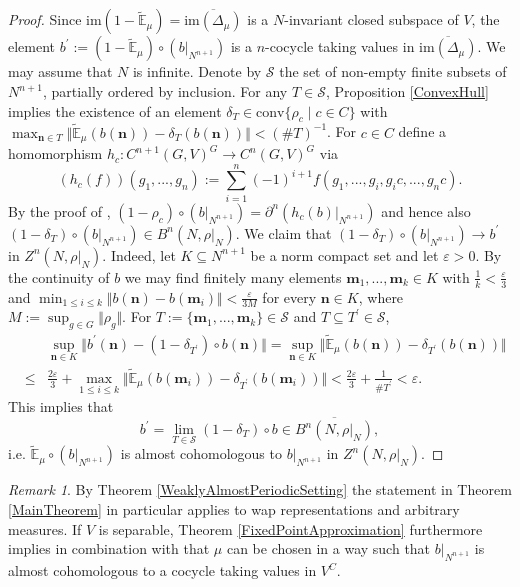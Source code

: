 \documentclass[a4paper,11pt,reqno]{amsart}
\numberwithin{equation}{section}
\theoremstyle{definition}
\theoremstyle{remark}
\theoremstyle{remark}
\newtheorem{remark}[theorem]{Remark}
\begin{document}
\begin{proof}
Since $\text{im}(1-\widetilde{\mathbb{E}}_{\mu})=\overline{\text{im}(\Delta_{\mu})}$ is a $N$-invariant closed subspace of $V$, the element $b^{\prime}:=(1-\widetilde{\mathbb{E}}_{\mu})\circ(b|_{N^{n+1}})$ is a $n$-cocycle taking values in $\overline{\text{im}(\Delta_{\mu})}$. We may assume that $N$ is infinite. Denote by $\mathcal{S}$ the set of non-empty finite subsets of $N^{n+1}$, partially ordered by inclusion. For any $T\in\mathcal{S}$, Proposition \ref{ConvexHull} implies the existence of an element $\delta_{T}\in\text{conv}\{\rho_{c}\mid c\in C\}$ with $\max_{\mathbf{n}\in T}\Vert\widetilde{\mathbb{E}}_{\mu}(b(\mathbf{n}))-\delta_{T}(b(\mathbf{n}))\Vert<(\#T)^{-1}$. For $c\in C$ define a homomorphism $h_{c}:C^{n+1}(G,V)^{G}\rightarrow C^{n}(G,V)^{G}$ via 
\[
\left(h_{c}(f)\right)(g_{1},...,g_{n}):=\sum_{i=1}^{n}(-1)^{i+1}f(g_{1},...,g_{i},g_{i}c,...,g_{n}c).
\]
By the proof of \cite[Lemma 18]{BaderRosendalSauer}, $(1-\rho_{c})\circ(b|_{N^{n+1}})=\partial^{n}\left(h_{c}(b)|_{N^{n+1}}\right)$ and hence also $(1-\delta_{T})\circ(b|_{N^{n+1}})\in B^{n}(N,\rho|_{N})$. We claim that $(1-\delta_{T})\circ(b|_{N^{n+1}})\rightarrow b^{\prime}$ in $Z^{n}(N,\rho|_{N})$. Indeed, let $K\subseteq N^{n+1}$ be a norm compact set and let $\varepsilon>0$. By the continuity of $b$ we may find finitely many elements $\mathbf{m}_{1},...,\mathbf{m}_{k}\in K$ with $\frac{1}{k}<\frac{\varepsilon}{3}$ and $\min_{1\leq i\leq k}\Vert b(\mathbf{n})-b(\mathbf{m}_{i})\Vert<\frac{\varepsilon}{3M}$ for every $\mathbf{n}\in K$, where $M:=\sup_{g\in G}\Vert\rho_{g}\Vert$. For $T:=\{\mathbf{m}_{1},...,\mathbf{m}_{k}\}\in\mathcal{S}$ and $T\subseteq T^{\prime}\in\mathcal{S}$, 
\begin{eqnarray*}
 &  & \sup_{\mathbf{n}\in K}\Vert b^{\prime}(\mathbf{n})-(1-\delta_{T^{\prime}})\circ b(\mathbf{n})\Vert=\sup_{\mathbf{n}\in K}\Vert\widetilde{\mathbb{E}}_{\mu}(b(\mathbf{n}))-\delta_{T^{\prime}}(b(\mathbf{n}))\Vert\\
 & \leq & \frac{2\varepsilon}{3}+\max_{1\leq i\leq k}\Vert\widetilde{\mathbb{E}}_{\mu}(b(\mathbf{m}_{i}))-\delta_{T^{\prime}}(b(\mathbf{m}_{i}))\Vert<\frac{2\varepsilon}{3}+\frac{1}{\#T^{\prime}}<\varepsilon.
\end{eqnarray*}
This implies that 
\[
b^{\prime}=\lim_{T\in\mathcal{S}}(1-\delta_{T})\circ b\in\overline{B^{n}(N,\rho|_{N})},
\]
i.e. $\widetilde{\mathbb{E}}_{\mu}\circ(b|_{N^{n+1}})$ is almost cohomologous to $b|_{N^{n+1}}$ in $Z^{n}(N,\rho|_{N})$. \end{proof}

\begin{remark} By Theorem \ref{WeaklyAlmostPeriodicSetting} the statement in Theorem \ref{MainTheorem} in particular applies to wap representations and arbitrary measures. If $V$ is separable, Theorem \ref{FixedPointApproximation} furthermore implies in combination with \cite[Lemma 17]{BaderRosendalSauer} that $\mu$ can be chosen in a way such that $b|_{N^{n+1}}$ is almost cohomologous to a cocycle taking values in $V^{C}$. \end{remark}
\end{document}
